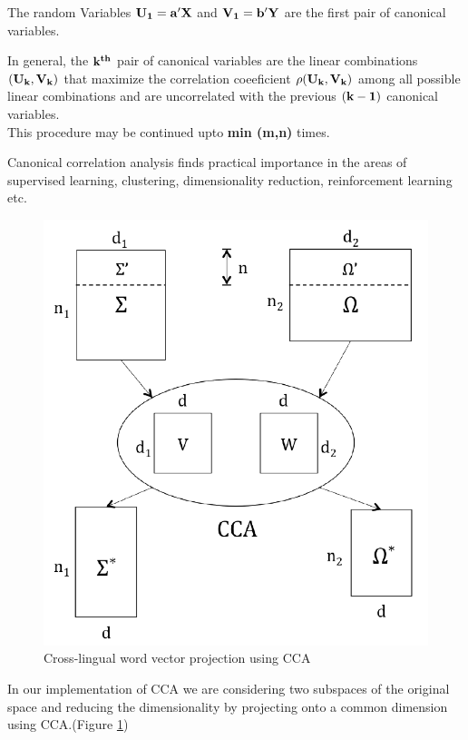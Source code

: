 \documentclass{article} %
\begin{document}
	The random Variables $\bf{U_1 = a'X}$ and $\bf{V_1 = b'Y}$ are the first pair of canonical variables.
	
	In general, the $\bf{k^{th}}$ pair of canonical variables are the linear combinations $(\bf{U_k,V_k})$ that maximize the correlation coeeficient $\bf{\rho}(\bf{U_k,V_k})$ among all possible linear combinations and are uncorrelated with the previous $\bf{(k-1)}$ canonical variables.\\
	This procedure may be continued upto {\bf{min (m,n)}} times.\cite{ccaimpl}
	
	Canonical correlation analysis finds practical importance in the areas of supervised learning, clustering, dimensionality reduction, reinforcement learning etc.
	
	\begin{figure}[H]
		\begin{center}
			\includegraphics[scale = 0.6]{Figures/cca.png}
			\caption{Cross-lingual word vector projection using CCA	}
			\label{fig:CCA_implementation}
		\end{center}
	\end{figure}
	
	In our implementation of CCA we are considering two subspaces of the original space and reducing the dimensionality by projecting onto a common dimension using CCA.(Figure \ref{fig:CCA_implementation})
	
\end{document}
